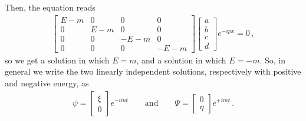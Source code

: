 \documentclass[main.tex]{subfiles}
\begin{document}
Then, the equation reads 
%
\begin{subequations}
\begin{align}
\left[\begin{array}{cccc}
E-m & 0 & 0 & 0 \\ 
0 & E-m & 0 & 0 \\ 
0 & 0 & -E-m & 0 \\ 
0 & 0 & 0 & -E-m
\end{array}\right] 
\left[\begin{array}{c}
a \\ 
b \\ 
c \\ 
d
\end{array}\right] e^{-ipx}
= 0
\,,
\end{align}
\end{subequations}
%
so we get a solution in which \(E=m\), and a solution in which \(E = -m \). So, in general we write the two linearly independent  solutions, respectively with positive and negative energy, as 
%
\begin{subequations}
\begin{align}
\psi = \left[\begin{array}{c}
\xi  \\ 
0
\end{array}\right] e^{-imt}
\qquad \text{and} \qquad
\Psi = \left[\begin{array}{c}
0 \\ 
\eta 
\end{array}\right] e^{+imt}
\,.
\end{align}
\end{subequations}
\end{document}
